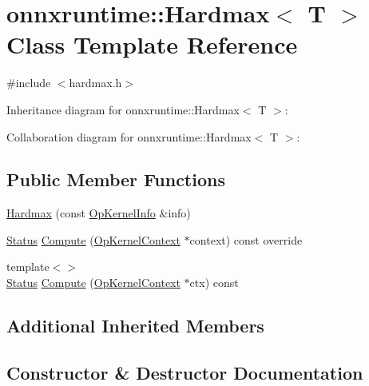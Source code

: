 \hypertarget{classonnxruntime_1_1Hardmax}{}\section{onnxruntime\+:\+:Hardmax$<$ T $>$ Class Template Reference}
\label{classonnxruntime_1_1Hardmax}


{\ttfamily \#include $<$hardmax.\+h$>$}



Inheritance diagram for onnxruntime\+:\+:Hardmax$<$ T $>$\+:


Collaboration diagram for onnxruntime\+:\+:Hardmax$<$ T $>$\+:
\subsection*{Public Member Functions}
\begin{DoxyCompactItemize}
\item 
\mbox{\hyperlink{classonnxruntime_1_1Hardmax_aef53b7b6718d17d1a84659cc4cc6ee75}{Hardmax}} (const \mbox{\hyperlink{classonnxruntime_1_1OpKernelInfo}{Op\+Kernel\+Info}} \&info)
\item 
\mbox{\hyperlink{classonnxruntime_1_1common_1_1Status}{Status}} \mbox{\hyperlink{classonnxruntime_1_1Hardmax_a28b0fa9d4aa2b1ae9e0b2b1f49a6525d}{Compute}} (\mbox{\hyperlink{classonnxruntime_1_1OpKernelContext}{Op\+Kernel\+Context}} $\ast$context) const override
\item 
{\footnotesize template$<$$>$ }\\\mbox{\hyperlink{classonnxruntime_1_1common_1_1Status}{Status}} \mbox{\hyperlink{classonnxruntime_1_1Hardmax_a2ece131739b253c2d06d655a1c923124}{Compute}} (\mbox{\hyperlink{classonnxruntime_1_1OpKernelContext}{Op\+Kernel\+Context}} $\ast$ctx) const
\end{DoxyCompactItemize}
\subsection*{Additional Inherited Members}


\subsection{Constructor \& Destructor Documentation}
\mbox{\label{classonnxruntime_1_1Hardmax_aef53b7b6718d17d1a84659cc4cc6ee75}} 
